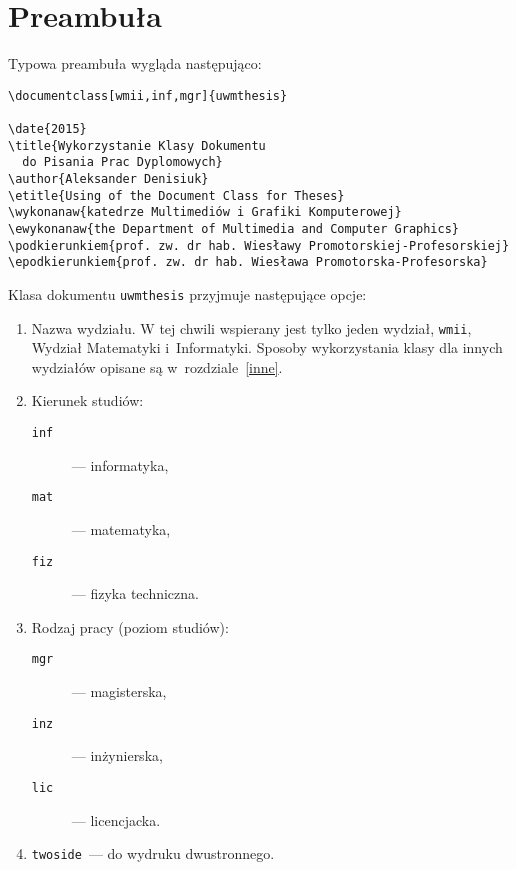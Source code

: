 \section{Preambuła}

Typowa preambuła wygląda następująco:
\begin{verbatim}
\documentclass[wmii,inf,mgr]{uwmthesis}

\date{2015}
\title{Wykorzystanie Klasy Dokumentu 
  do Pisania Prac Dyplomowych}
\author{Aleksander Denisiuk}
\etitle{Using of the Document Class for Theses}
\wykonanaw{katedrze Multimediów i Grafiki Komputerowej}
\ewykonanaw{the Department of Multimedia and Computer Graphics}
\podkierunkiem{prof. zw. dr hab. Wiesławy Promotorskiej-Profesorskiej}
\epodkierunkiem{prof. zw. dr hab. Wiesława Promotorska-Profesorska}
\end{verbatim}

Klasa dokumentu \texttt{uwmthesis} przyjmuje następujące opcje:
\begin{enumerate}
 \item Nazwa wydziału. W tej chwili wspierany jest tylko jeden wydział, \texttt{wmii}, Wydział Matematyki i~Informatyki. Sposoby wykorzystania klasy dla innych wydziałów opisane są w~rozdziale~\ref{inne}.
 \item Kierunek studiów:
 \begin{description}
  \item [\texttt{inf}]--- informatyka,
  \item [\texttt{mat}]--- matematyka,
  \item [\texttt{fiz}]--- fizyka techniczna.
 \end{description}
\item Rodzaj pracy (poziom studiów):
 \begin{description}
  \item [\texttt{mgr}]--- magisterska,
  \item [\texttt{inz}]--- inżynierska,
  \item [\texttt{lic}]--- licencjacka.
 \end{description}
\item \texttt{twoside}~--- do wydruku dwustronnego.
\end{enumerate}

